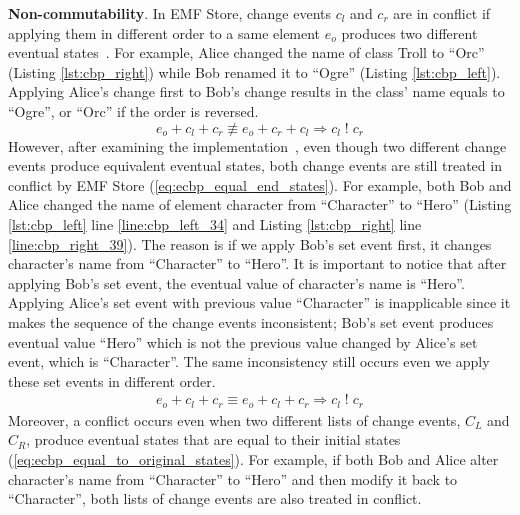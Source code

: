 \textbf{Non-commutability}. In EMF Store, change events $c_{l}$ and $c_{r}$ are in conflict if applying them in different order to a same element $e_{o}$ produces two different eventual states~\cite{koegel2010operation}. For example, Alice changed the \textsf{name} of class \textsf{Troll} to ``Orc'' (Listing \ref{lst:cbp_right}) while Bob renamed it to ``Ogre'' (Listing \ref{lst:cbp_left}). Applying Alice's change first to Bob's change results in the class' \textsf{name} equals to ``Ogre'', or ``Orc'' if the order is reversed.
\begin{equation} \label{eq:change_noncommutability}
e_{o} + c_{l} + c_{r} \not\equiv e_{o} + c_{r} + c_{l} \Rightarrow c_{l}\;!\;c_{r}
\end{equation} 
However, after examining the implementation~\cite{eclipse2019emfstore}, even though two different change events produce equivalent eventual states, both change events are still treated in conflict by EMF Store (\ref{eq:ecbp_equal_end_states}). For example, both Bob and Alice changed the \textsf{name} of element \textsf{character} from ``Character'' to ``Hero'' (Listing \ref{lst:cbp_left} line \ref{line:cbp_left_34} and Listing \ref{lst:cbp_right} line \ref{line:cbp_right_39}). The reason is if we apply Bob's set event first, it changes \textsf{character}'s \textsf{name} from ``Character'' to ``Hero''. It is important to notice that after applying Bob's set event, the eventual value of \textsf{character}'s \textsf{name} is ``Hero''. Applying Alice's set event with previous value ``Character'' is inapplicable since it makes the sequence of the change events inconsistent; Bob's set event produces eventual value ``Hero'' which is not the previous value changed by Alice's set event, which is ``Character''. The same inconsistency still occurs even we apply these set events in different order.
\begin{equation} \label{eq:ecbp_equal_end_states}
\begin{split}
	e_{o} + c_{l} + c_{r} \equiv e_{o} + c_{l} + c_{r} \Rightarrow c_{l}\;!\;c_{r}
\end{split}
\end{equation} 
Moreover, a conflict occurs even when two different lists of change events, $C_{L}$ and $C_{R}$, produce eventual states that are equal to their initial states (\ref{eq:ecbp_equal_to_original_states}). For example, if both Bob and Alice alter \textsf{character}'s \textsf{name} from ``Character'' to ``Hero'' and then modify it back to ``Character'', both lists of change events are also treated in conflict.
